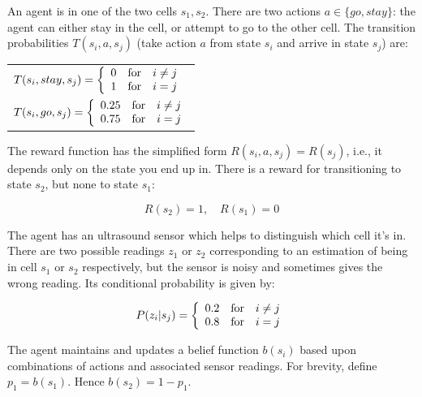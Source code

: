 \documentclass[12pt]{article}
\begin{document}
An agent is in one of the two cells $s_1,s_2$.  There are two actions
$a \in \{ go, stay\}$: the agent can either stay in the cell, or
attempt to go to the other cell.  The transition probabilities
$T(s_i,a,s_j)$ (take action $a$ from state $s_i$ and arrive in state
$s_j$) are:

\begin{center}
\begin{tabular}{l}
$T(s_i,stay,s_j) = \left\{ \begin{array}{lll}
                                   0 & \hbox{for} & i\neq j \\
                                   1 & \hbox{for} & i = j
                            \end{array}
                    \right.$ \\[.2in]
$T(s_i,go,s_j) = \left\{ \begin{array}{lll}
                                   0.25 & \hbox{for} & i\neq j \\
                                   0.75 & \hbox{for} & i = j
                            \end{array}
                    \right.$
\end{tabular}
\end{center}

\noindent
The reward function has the simplified form $R(s_i,a,s_j) = R(s_j)$,
i.e., it depends only on the state you end up in.  There is a reward
for transitioning to state $s_2$, but none to state $s_1$:

$$R(s_2) = 1, \quad R(s_1) = 0$$

\noindent
The agent has an ultrasound sensor which helps to distinguish which
cell it's in.  There are two possible readings $z_1$ or $z_2$
corresponding to an estimation of being in cell $s_1$ or $s_2$
respectively, but the sensor is noisy and sometimes gives the wrong
reading.  Its conditional probability is given by:

$$P(z_i | s_j) = \left\{ \begin{array}{lll}
                                   0.2 & \hbox{for} & i\neq j \\
                                   0.8 & \hbox{for} & i = j
                            \end{array}
                    \right.$$

\noindent
The agent maintains and updates a belief function $b(s_i)$ based upon
combinations of actions and associated sensor readings.  For brevity,
define $p_1 = b(s_1)$.  Hence $b(s_2) = 1 - p_1$.
\end{document}
